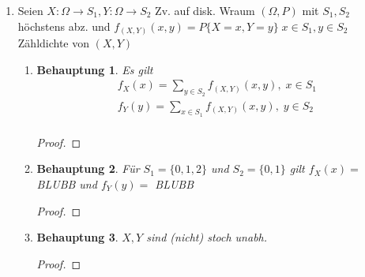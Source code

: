 \documentclass[a4paper]{scrartcl}
\newtheorem*{behaupt}{Behauptung}
\begin{document}
\begin{enumerate}[label=\bfseries\arabic*.]
\begin{enumerate}[label=(\alph*)]
        \end{enumerate}

    \item	        
        Seien $X:\Omega\rightarrow S_1,Y:\Omega\rightarrow S_2$ Zv. auf disk. Wraum $(\Omega,P)$
        mit $S_1,S_2$ höchstens abz. und $f_{(X,Y)}(x,y)=P\{X=x,Y=y\}\; x\in S_1,y\in S_2$
        Zähldichte von $(X,Y)$
        \begin{enumerate}[label=(\alph*)]
            \item
                \begin{behaupt}
                    Es gilt
                    \begin{align*}
                    f_X(x)=\sum_{y\in S_2} f_{(X,Y)}(x,y),\; x\in S_1\\
                    f_Y(y)=\sum_{x\in S_1} f_{(X,Y)}(x,y),\; y\in S_2\\
                    \end{align*}
                \end{behaupt}
                \begin{proof}
                
                \end{proof}
                
            \item
                \begin{behaupt}
                    Für $S_1=\{0,1,2\}$ und $S_2=\{0,1\}$ gilt $f_X(x)=$ BLUBB und $f_Y(y)=$ BLUBB
                \end{behaupt}
                \begin{proof}
                    
                \end{proof}
                
            \item
                \begin{behaupt}
                    $X,Y$ sind (nicht) stoch unabh.
                \end{behaupt}
                \begin{proof}
                    
                \end{proof}
        \end{enumerate}

                

\end{enumerate}
\end{document}
